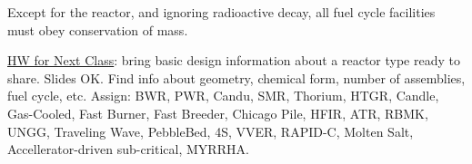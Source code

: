 Except for the reactor, and ignoring radioactive decay, all fuel cycle facilities must obey conservation of mass.

\underline{HW for Next Class}: bring basic design information about a reactor type ready to share. Slides OK. Find info
about geometry, chemical form, number of assemblies, fuel cycle, etc.
Assign: BWR, PWR, Candu, SMR, Thorium, HTGR, Candle, Gas-Cooled, Fast Burner, Fast Breeder, Chicago Pile, HFIR, ATR,
RBMK, UNGG, Traveling Wave, PebbleBed, 4S, VVER, RAPID-C, Molten Salt, Accellerator-driven sub-critical, MYRRHA.
